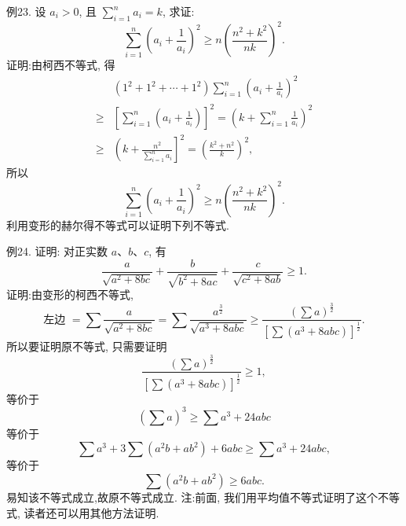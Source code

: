 例23. 设 $a_i>0$, 且 $\sum_{i=1}^n a_i=k$, 求证:
$$
\sum_{i=1}^n\left(a_i+\frac{1}{a_i}\right)^2 \geqslant n\left(\frac{n^2+k^2}{n k}\right)^2 .
$$
证明:由柯西不等式, 得
$$
\begin{aligned}
& \left(1^2+1^2+\cdots+1^2\right) \sum_{i=1}^n\left(a_i+\frac{1}{a_i}\right)^2 \\
\geqslant & {\left[\sum_{i=1}^n\left(a_i+\frac{1}{a_i}\right)\right]^2=\left(k+\sum_{i=1}^n \frac{1}{a_i}\right)^2 } \\
\geqslant & \left(k+\frac{n^2}{\sum_{i=1}^n a_i}\right]^2=\left(\frac{k^2+n^2}{k}\right)^2,
\end{aligned}
$$
所以
$$
\sum_{i=1}^n\left(a_i+\frac{1}{a_i}\right)^2 \geqslant n\left(\frac{n^2+k^2}{n k}\right)^2 .
$$
利用变形的赫尔得不等式可以证明下列不等式.



例24. 证明: 对正实数 $a 、 b 、 c$, 有
$$
\frac{a}{\sqrt{a^2+8 b c}}+\frac{b}{\sqrt{b^2+8 a c}}+\frac{c}{\sqrt{c^2+8 a b}} \geqslant 1 .
$$
证明:由变形的柯西不等式,
$$
\text { 左边 }=\sum \frac{a}{\sqrt{a^2+8 b c}}=\sum \frac{a^{\frac{3}{2}}}{\sqrt{a^3+8 a b c}} \geqslant \frac{\left(\sum a\right)^{\frac{3}{2}}}{\left[\sum\left(a^3+8 a b c\right)\right]^{\frac{1}{2}}} \text {. }
$$
所以要证明原不等式, 只需要证明
$$
\frac{\left(\sum a\right)^{\frac{3}{2}}}{\left[\sum\left(a^3+8 a b c\right)\right]^{\frac{1}{2}}} \geqslant 1,
$$
等价于
$$
\left(\sum a\right)^3 \geqslant \sum a^3+24 a b c
$$
等价于
$$
\sum a^3+3 \sum\left(a^2 b+a b^2\right)+6 a b c \geqslant \sum a^3+24 a b c,
$$
等价于
$$
\sum\left(a^2 b+a b^2\right) \geqslant 6 a b c .
$$
易知该不等式成立,故原不等式成立.
注:前面, 我们用平均值不等式证明了这个不等式, 读者还可以用其他方法证明.


